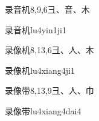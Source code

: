 \begin{entry}{录音机}{8,9,6}{⼹、⾳、⽊}
  \begin{phonetics}{录音机}{lu4yin1ji1}
  \end{phonetics}
\end{entry}

\begin{entry}{录像机}{8,13,6}{⼹、⼈、⽊}
  \begin{phonetics}{录像机}{lu4xiang4ji1}
  \end{phonetics}
\end{entry}

\begin{entry}{录像带}{8,13,9}{⼹、⼈、⼱}
  \begin{phonetics}{录像带}{lu4xiang4dai4}
  \end{phonetics}
\end{entry}


